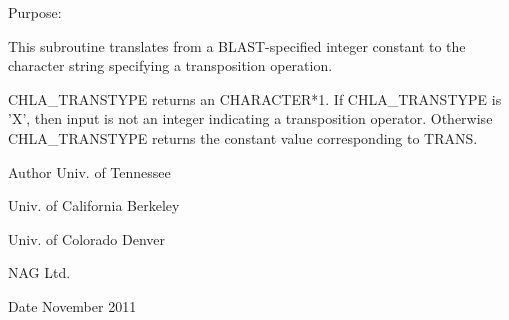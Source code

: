  \begin{DoxyParagraph}{Purpose\+: }
\begin{DoxyVerb} This subroutine translates from a BLAST-specified integer constant to
 the character string specifying a transposition operation.

 CHLA_TRANSTYPE returns an CHARACTER*1.  If CHLA_TRANSTYPE is 'X',
 then input is not an integer indicating a transposition operator.
 Otherwise CHLA_TRANSTYPE returns the constant value corresponding to
 TRANS.\end{DoxyVerb}
 
\end{DoxyParagraph}
\begin{DoxyAuthor}{Author}
Univ. of Tennessee 

Univ. of California Berkeley 

Univ. of Colorado Denver 

N\+A\+G Ltd. 
\end{DoxyAuthor}
\begin{DoxyDate}{Date}
November 2011 
\end{DoxyDate}
